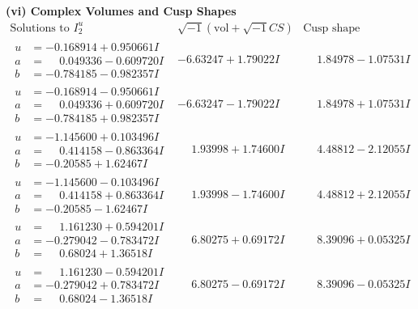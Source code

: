 \documentclass[1p]{elsarticle_modified}
\theoremstyle{definition}
\newcommand{\I}{\sqrt{-1}}
\begin{document}
\newpage\flushleft \textbf{(vi) Complex Volumes and Cusp Shapes}
$$\begin{array}{c|c|c}  
\text{Solutions to }I^u_{2}& \I (\text{vol} + \sqrt{-1}CS) & \text{Cusp shape}\\
 \hline 
\begin{aligned}
u &= -0.168914 + 0.950661 I \\
a &= \phantom{-}0.049336 - 0.609720 I \\
b &= -0.784185 - 0.982357 I\end{aligned}
 & -6.63247 + 1.79022 I & \phantom{-}1.84978 - 1.07531 I \\ \hline\begin{aligned}
u &= -0.168914 - 0.950661 I \\
a &= \phantom{-}0.049336 + 0.609720 I \\
b &= -0.784185 + 0.982357 I\end{aligned}
 & -6.63247 - 1.79022 I & \phantom{-}1.84978 + 1.07531 I \\ \hline\begin{aligned}
u &= -1.145600 + 0.103496 I \\
a &= \phantom{-}0.414158 - 0.863364 I \\
b &= -0.20585 + 1.62467 I\end{aligned}
 & \phantom{-}1.93998 + 1.74600 I & \phantom{-}4.48812 - 2.12055 I \\ \hline\begin{aligned}
u &= -1.145600 - 0.103496 I \\
a &= \phantom{-}0.414158 + 0.863364 I \\
b &= -0.20585 - 1.62467 I\end{aligned}
 & \phantom{-}1.93998 - 1.74600 I & \phantom{-}4.48812 + 2.12055 I \\ \hline\begin{aligned}
u &= \phantom{-}1.161230 + 0.594201 I \\
a &= -0.279042 - 0.783472 I \\
b &= \phantom{-}0.68024 + 1.36518 I\end{aligned}
 & \phantom{-}6.80275 + 0.69172 I & \phantom{-}8.39096 + 0.05325 I \\ \hline\begin{aligned}
u &= \phantom{-}1.161230 - 0.594201 I \\
a &= -0.279042 + 0.783472 I \\
b &= \phantom{-}0.68024 - 1.36518 I\end{aligned}
 & \phantom{-}6.80275 - 0.69172 I & \phantom{-}8.39096 - 0.05325 I \\ \hline\begin{aligned}

\end{aligned}
\end{array}$$
\end{document}
